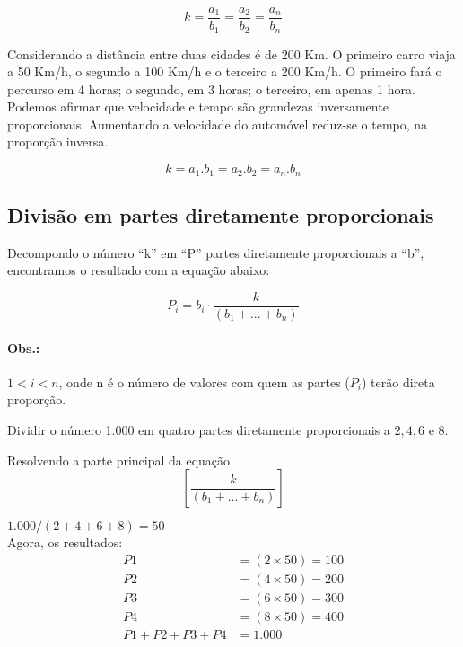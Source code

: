 \begin{equation}
k =\frac{a_1}{b_1}=\frac{a_2}{b_2}=\frac{a_n}{b_n}
\end{equation}

Considerando a distância entre duas cidades é de 200 Km. O primeiro carro viaja a 50 Km/h, o segundo a 100 Km/h e o terceiro a 200 Km/h. O primeiro fará o percurso em 4 horas; o segundo, em 3 horas; o terceiro, em apenas 1 hora. Podemos afirmar que velocidade e tempo são grandezas inversamente proporcionais. Aumentando a velocidade do automóvel reduz-se o tempo, na proporção inversa.

\begin{equation}
k = a_1.b_1 = a_2.b_2 = a_n.b_n
\end{equation}

\subsection{Divisão em partes diretamente proporcionais}

Decompondo o número “k” em “P” partes diretamente proporcionais a “b”, encontramos o resultado com a equação abaixo:

\begin{equation}
P_i = b_i \cdot \frac{k}{(b_1+...+b_n)}
\end{equation}


\paragraph{Obs.:} $1<i<n$, onde n é o número de valores com quem as partes ($P_i$) terão direta proporção.

\begin{exe}
Dividir o número 1.000 em quatro partes diretamente proporcionais a $2, 4, 6$ e $8$.
\end{exe}

Resolvendo a parte principal da equação
\begin{equation*}
\left[\frac{k}{(b_1+...+b_n)} \right]
\end{equation*}

	
$1.000 / (2 + 4 + 6 + 8) = 50$\\

Agora, os resultados:
\begin{align*}
	P1 &= (2 \times 50) = 100\\
	P2 &= (4 \times 50) = 200\\
	P3 &= (6 \times 50) = 300\\
	P4 &= (8 \times 50) = 400\\
	P1 + P2 + P3 + P4 &= 1.000
\end{align*}


